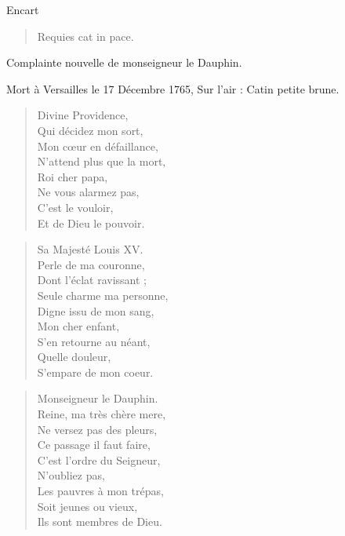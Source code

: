 \begin{diary}{Encart}{}
        \begin{verse}Requies cat in pace.\\\end{verse}
        \bigskip

        \begin{Large} Complainte nouvelle
                              de monseigneur le Dauphin.
                           \end{Large}\bigskip

                         Mort à Versailles
                              le 17 Décembre 1765, Sur l'air : Catin
                              petite brune. \bigskip

        \begin{verse}Divine Providence,\\Qui décidez mon sort,\\Mon cœur en défaillance,\\N'attend plus que la mort,\\Roi cher papa,\\Ne vous alarmez pas,\\C’est le vouloir,\\Et de Dieu le pouvoir.\\\end{verse}
        \bigskip

        \begin{verse}Sa Majesté Louis XV.\\Perle de ma couronne,\\Dont l'éclat ravissant ;\\Seule charme ma personne,\\Digne issu de mon sang,\\Mon cher enfant,\\S'en retourne au néant,\\Quelle douleur,\\S'empare de mon coeur.\\\end{verse}
        \bigskip

        \begin{verse}Monseigneur le Dauphin.\\Reine, ma très chère
                                    mere,\\Ne versez pas des pleurs,\\Ce passage il faut faire,\\C'est l’ordre du Seigneur,\\N’oubliez pas,\\Les pauvres à mon trépas,\\Soit jeunes ou vieux,\\Ils sont membres de Dieu.\\\end{verse}
        \bigskip


\end{diary}
